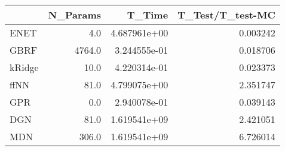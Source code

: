 \begin{tabular}{lrrr}
\toprule
{} &  N\_Params &        T\_Time &  T\_Test/T\_test-MC \\
\midrule
ENET   &       4.0 &  4.687961e+00 &          0.003242 \\
GBRF   &    4764.0 &  3.244555e-01 &          0.018706 \\
kRidge &      10.0 &  4.220314e-01 &          0.023373 \\
ffNN   &      81.0 &  4.799075e+00 &          2.351747 \\
GPR    &       0.0 &  2.940078e-01 &          0.039143 \\
DGN    &      81.0 &  1.619541e+09 &          2.421051 \\
MDN    &     306.0 &  1.619541e+09 &          6.726014 \\
\bottomrule
\end{tabular}
